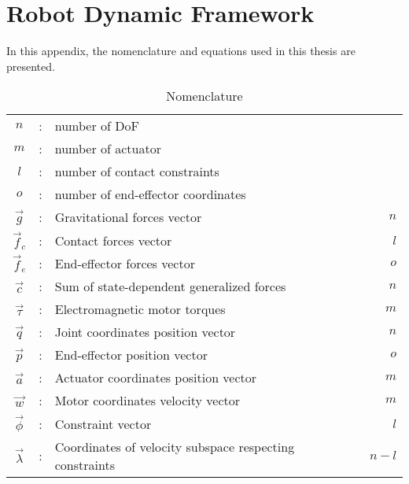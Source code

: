 \chapter{Robot Dynamic Framework}
\label{sec:robotdynamic}

In this appendix, the nomenclature and equations used in this thesis are presented.

\begin{table}[htbp]
	\centering
	\caption{Nomenclature}	%
		\begin{tabular}{ c c l r }
        \hline \hline
			$n$             &  :  & number of DoF                                              & \\
			$m$             &  :  & number of actuator                                         & \\
			$l$             &  :  & number of contact constraints                              & \\
			$o$             &  :  & number of end-effector coordinates                         & \\ \hline \hline
			$\vec{g}$       &  :  & Gravitational forces vector                                & $n$  \\
			$\vec{f}_c$     &  :  & Contact forces vector                                      & $l$  \\
			$\vec{f}_e$     &  :  & End-effector forces vector                                 & $o$  \\
			$\vec{c}$       &  :  & Sum of state-dependent generalized forces                  & $n$  \\
			$\vec{\tau}$    &  :  & Electromagnetic motor torques                              & $m$  \\
			$\vec{q}$       &  :  & Joint coordinates position vector                          & $n$  \\
			$\vec{p}$       &  :  & End-effector position vector                               & $o$  \\
			$\vec{a}$       &  :  & Actuator coordinates position vector                       & $m$  \\
			$\vec{w}$       &  :  & Motor coordinates velocity vector                          & $m$  \\ 
			$\vec{\phi}$    &  :  & Constraint vector                                          & $l$  \\
			$\vec{\lambda}$ &  :  & Coordinates of velocity subspace respecting constraints    & $n-l$  \\\hline \hline

\end{tabular}
\end{table}
